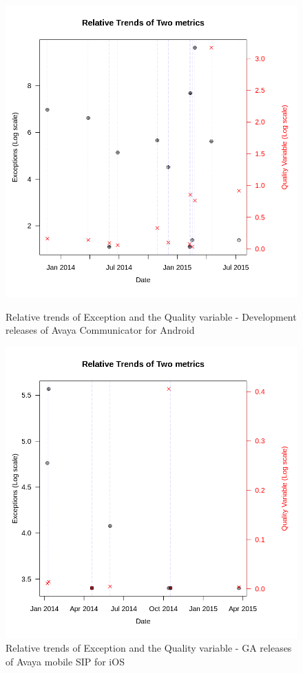 \documentclass[smallcondensed]{svjour3}     %
\begin{document}
\begin{figure}[!t]
\begin{minipage}{.45\textwidth}
\raggedleft
\includegraphics[width=\linewidth]{trend_dev}
\caption{Relative trends of Exception and the Quality variable - Development releases of Avaya Communicator for Android}
\label{fig:trend_dev}
\end{minipage}
\hfill
\begin{minipage}{.45\textwidth}
\raggedright 
\includegraphics[width=\linewidth]{trend_ios}
\caption{Relative trends of Exception and the Quality variable - GA releases of Avaya mobile SIP for iOS}
\label{fig:trend_ios}
\end{minipage}
\end{figure}
\end{document}
